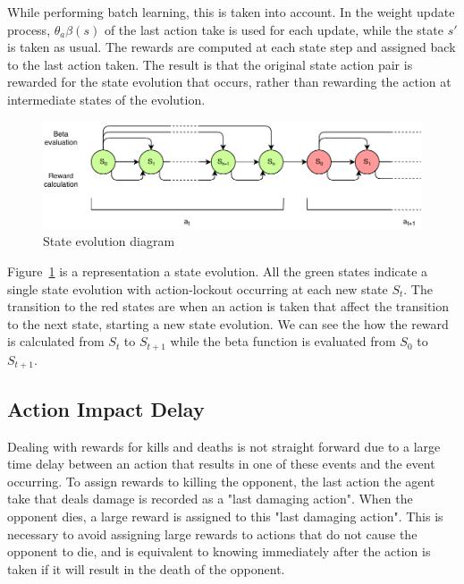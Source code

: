 While performing batch learning, this is taken into account. In the weight update process, $\theta_a\beta(s)$ of the last action take is used for each update, while the state $s'$ is taken as usual. The rewards are computed at each state step and assigned back to the last action taken. The result is that the original state action pair is rewarded for the state evolution that occurs, rather than rewarding the action at intermediate states of the evolution. 

\begin{figure}[!htb]
	\centering
	\includegraphics[width=120mm]{stateevolution.pdf}
	\caption{State evolution diagram}
	\label{fig:stateevo}
\end{figure}

Figure~\ref{fig:stateevo} is a representation a state evolution. All the green states indicate a single state evolution with action-lockout occurring at each new state $S_{t}$. The transition to the red states are when an action is taken that affect the transition to the next state, starting a new state evolution. We can see the how the reward is calculated from $S_{t}$ to $S_{t+1}$ while the beta function is evaluated from $S_{0}$ to $S_{t+1}$.

\subsection{Action Impact Delay}

Dealing with rewards for kills and deaths is not straight forward due to a large time delay between an action that results in one of these events and the event occurring. To assign rewards to killing the opponent, the last action the agent take that deals damage is recorded as a "last damaging action". When the opponent dies, a large reward is assigned to this "last damaging action". This is necessary to avoid assigning large rewards to actions that do not cause the opponent to die, and is equivalent to knowing immediately after the action is taken if it will result in the death of the opponent.
